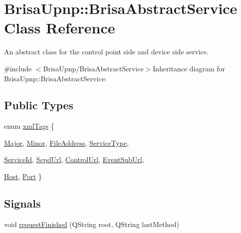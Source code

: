 \hypertarget{classBrisaUpnp_1_1BrisaAbstractService}{
\section{BrisaUpnp::BrisaAbstractService Class Reference}
\label{classBrisaUpnp_1_1BrisaAbstractService}
}


An abstract class for the control point side and device side service.  


{\ttfamily \#include $<$BrisaUpnp/BrisaAbstractService$>$}Inheritance diagram for BrisaUpnp::BrisaAbstractService:\subsection*{Public Types}
\begin{DoxyCompactItemize}
\item 
enum \hyperlink{classBrisaUpnp_1_1BrisaAbstractService_a411d13859b50b5bdb1f81e61861dbe43}{xmlTags} \{ \par
\hyperlink{classBrisaUpnp_1_1BrisaAbstractService_a411d13859b50b5bdb1f81e61861dbe43a50a17ad3bd5cf85af4faa94f085b960c}{Major}, 
\hyperlink{classBrisaUpnp_1_1BrisaAbstractService_a411d13859b50b5bdb1f81e61861dbe43acce9853b50b9241c14302cf755322319}{Minor}, 
\hyperlink{classBrisaUpnp_1_1BrisaAbstractService_a411d13859b50b5bdb1f81e61861dbe43aa92e41b4ede5e98a736e6bee64a630d9}{FileAddress}, 
\hyperlink{classBrisaUpnp_1_1BrisaAbstractService_a411d13859b50b5bdb1f81e61861dbe43abbe7cfde83882a3e9fb52353503c5c4d}{ServiceType}, 
\par
\hyperlink{classBrisaUpnp_1_1BrisaAbstractService_a411d13859b50b5bdb1f81e61861dbe43aa82d0f9f3bd19ac33af33b29a4e98b35}{ServiceId}, 
\hyperlink{classBrisaUpnp_1_1BrisaAbstractService_a411d13859b50b5bdb1f81e61861dbe43addc2b7f03c7cc4d96bfa8452c0ddcdf7}{ScpdUrl}, 
\hyperlink{classBrisaUpnp_1_1BrisaAbstractService_a411d13859b50b5bdb1f81e61861dbe43a07ba26d7245d91cae689d6eb090f0c58}{ControlUrl}, 
\hyperlink{classBrisaUpnp_1_1BrisaAbstractService_a411d13859b50b5bdb1f81e61861dbe43ad4107e564a096deec670b2b4a4d9b3c0}{EventSubUrl}, 
\par
\hyperlink{classBrisaUpnp_1_1BrisaAbstractService_a411d13859b50b5bdb1f81e61861dbe43a25db80572e607b6b5927cf5415e7dd8d}{Host}, 
\hyperlink{classBrisaUpnp_1_1BrisaAbstractService_a411d13859b50b5bdb1f81e61861dbe43a5a28d6df46d4d5e5bf3114301d4e52ef}{Port}
 \}
\end{DoxyCompactItemize}
\subsection*{Signals}
\begin{DoxyCompactItemize}
\item 
void \hyperlink{classBrisaUpnp_1_1BrisaAbstractService_a122d9f06ff46be2a8fa97d9d749f026d}{requestFinished} (QString root, QString lastMethod)
\end{DoxyCompactItemize}
